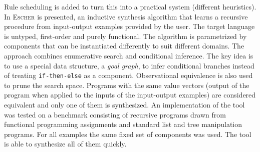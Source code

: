\begin{enumerate}
Rule scheduling is added to turn this into a practical system (different heuristics).\\
In \cite{EscherPaper} \textsc{Escher} is presented, an inductive synthesis algorithm that learns a recursive procedure from input-output examples provided by the user.  The target language is untyped, first-order and purely functional.
The algorithm is parametrized by components that can be instantiated differently to suit different domains.
The approach combines enumerative search and conditional inference. The key idea is to use a special data structure, a \emph{goal graph}, to infer conditional branches instead of treating \texttt{if-then-else} as a component.
Observational equivalence is also used to prune the search space. Programs with the same value vectors (output of the program when applied to the inputs of the input-output examples) are considered equivalent and only one of them is synthesized.
An implementation of the tool was tested on a benchmark consisting of recursive programs  drawn from functional programming assignments and standard list and tree manipulation programs.
For all examples the same fixed set of components was used.
The tool is able to synthesize all of them quickly. 
\end{enumerate}

